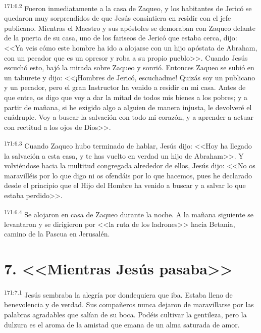 \par 
\textsuperscript{171:6.2} Fueron inmediatamente a la casa de Zaqueo, y los habitantes de Jericó se quedaron muy sorprendidos de que Jesús consintiera en residir con el jefe publicano. Mientras el Maestro y sus apóstoles se demoraban con Zaqueo delante de la puerta de su casa, uno de los fariseos de Jericó que estaba cerca, dijo: <<Ya veis cómo este hombre ha ido a alojarse con un hijo apóstata de Abraham, con un pecador que es un opresor y roba a su propio pueblo>>. Cuando Jesús escuchó esto, bajó la mirada sobre Zaqueo y sonrió. Entonces Zaqueo se subió en un taburete y dijo: <<¡Hombres de Jericó, escuchadme! Quizás soy un publicano y un pecador, pero el gran Instructor ha venido a residir en mi casa. Antes de que entre, os digo que voy a dar la mitad de todos mis bienes a los pobres; y a partir de mañana, si he exigido algo a alguien de manera injusta, le devolveré el cuádruple. Voy a buscar la salvación con todo mi corazón, y a aprender a actuar con rectitud a los ojos de Dios>>.

\par 
\textsuperscript{171:6.3} Cuando Zaqueo hubo terminado de hablar, Jesús dijo: <<Hoy ha llegado la salvación a esta casa, y te has vuelto en verdad un hijo de Abraham>>. Y volviéndose hacia la multitud congregada alrededor de ellos, Jesús dijo: <<No os maravilléis por lo que digo ni os ofendáis por lo que hacemos, pues he declarado desde el principio que el Hijo del Hombre ha venido a buscar y a salvar lo que estaba perdido>>.

\par 
\textsuperscript{171:6.4} Se alojaron en casa de Zaqueo durante la noche. A la mañana siguiente se levantaron y se dirigieron por <<la ruta de los ladrones>> hacia Betania, camino de la Pascua en Jerusalén.

\section*{7. <<Mientras Jesús pasaba>>}
\par 
\textsuperscript{171:7.1} Jesús sembraba la alegría por dondequiera que iba. Estaba lleno de benevolencia y de verdad. Sus compañeros nunca dejaron de maravillarse por las palabras agradables que salían de su boca. Podéis cultivar la gentileza, pero la dulzura es el aroma de la amistad que emana de un alma saturada de amor.

